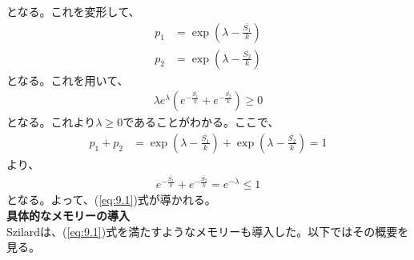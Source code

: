\documentclass[a4paper,11pt]{jsarticle}
\numberwithin{equation}{section}
\begin{document}
となる。これを変形して、
\begin{align}
    p_1 &= \exp(\lambda - \frac{\bar{S_1}}{k}) \\
    p_2 &= \exp(\lambda - \frac{\bar{S_2}}{k})
\end{align}
となる。これを用いて、
\begin{align}
    \lambda e^{\lambda}(e^{-\frac{\bar{S_1}}{k}} + e^{-\frac{\bar{S_2}}{k}}) \geq 0
\end{align}
となる。これより$\lambda \geq 0$であることがわかる。ここで、
\begin{align}
    p_1 + p_2 &= \exp(\lambda - \frac{\bar{S_1}}{k}) + \exp(\lambda - \frac{\bar{S_2}}{k}) = 1
\end{align}
より、
\begin{align}
    e^{-\frac{\bar{S_1}}{k}} + e^{-\frac{\bar{S_2}}{k}}  = e^{-\lambda} \leq 1
\end{align}
となる。よって、(\ref{eq:9.1})式が導かれる。\hfill\qedsymbol\\

\textbf{具体的なメモリーの導入}\\
Szilardは、(\ref{eq:9.1})式を満たすようなメモリーも導入した。以下ではその概要を見る。\\
\end{document}
